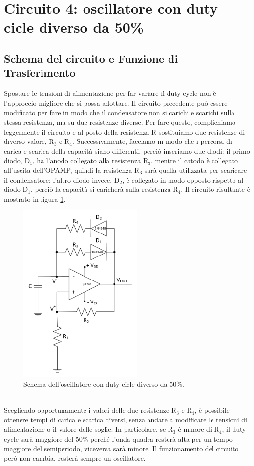 \documentclass{report}
\begin{document}
\section{Circuito 4: oscillatore con duty cicle diverso da 50\%}
\subsection{Schema del circuito e Funzione di Trasferimento}
Spostare le tensioni di alimentazione per far variare il duty cycle non è l'approccio migliore che si possa adottare. Il circuito precedente può essere modificato per fare in modo che il condensatore non si carichi e scarichi sulla stessa resistenza, ma su due resistenze diverse. Per fare questo, complichiamo leggermente il circuito e al posto della resistenza $\mathrm{R}$ sostituiamo due resistenze di diverso valore, $\mathrm{R_3}$ e $\mathrm{R_4}$. Successivamente, facciamo in modo che i percorsi di carica e scarica della capacità siano differenti, perciò inseriamo due diodi: il primo diodo, $\mathrm{D_1}$, ha l'anodo collegato alla resistenza $\mathrm{R_3}$, mentre il catodo è collegato all'uscita dell'OPAMP, quindi la resistenza $\mathrm{R_3}$ sarà quella utilizzata per scaricare il condensatore; l'altro diodo invece, $\mathrm{D_2}$, è collegato in modo opposto rispetto al diodo $\mathrm{D_1}$, perciò la capacità si caricherà sulla resistenza $\mathrm{R_4}$. Il circuito risultante è mostrato in figura \ref{figura:schema4}.
\begin{figure}[h!]
	\centering
	\includegraphics[height=9cm]{immagini/schema4}
	\caption{Schema dell'oscillatore con duty cicle diverso da 50\%.}
	\label{figura:schema4}
\end{figure}
\\Scegliendo opportunamente i valori delle due resistenze $\mathrm{R_3}$ e $\mathrm{R_4}$, è possibile ottenere tempi di carica e scarica diversi, senza andare a modificare le tensioni di alimentazione o il valore delle soglie. In particolare, se $\mathrm{R_3}$ è minore di $\mathrm{R_4}$, il duty cycle sarà maggiore del 50\% perché l'onda quadra resterà alta per un tempo maggiore del semiperiodo, viceversa sarà minore.  Il funzionamento del circuito però non cambia, resterà sempre un oscillatore. 
\end{document}
